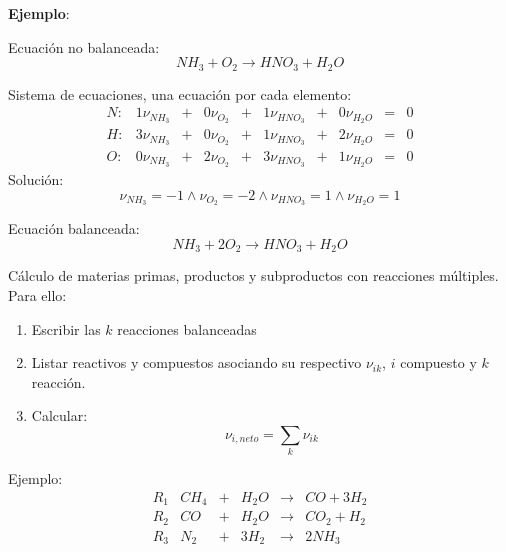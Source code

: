             \textbf{Ejemplo}:
            
            Ecuación no balanceada:
            \[NH_{3} + O_{2} \rightarrow HNO_{3} + H_{2}O\]
            
            Sistema de ecuaciones, una ecuación por cada elemento:
            \[
            \begin{matrix}
                N: & 1\nu_{NH_{3}} & + & 0\nu_{O_{2}} & + & 1\nu_{HNO_{3}} & + & 0\nu_{H_{2}O} & = & 0 \\
                H: & 3\nu_{NH_{3}} & + & 0\nu_{O_{2}} & + & 1\nu_{HNO_{3}} & + & 2\nu_{H_{2}O} & = & 0 \\
                O: & 0\nu_{NH_{3}} & + & 2\nu_{O_{2}} & + & 3\nu_{HNO_{3}} & + & 1\nu_{H_{2}O} & = & 0
            \end{matrix}
            \]
            Solución:
            \[\nu_{NH_{3}} = -1 \wedge \nu_{O_{2}} = -2 \wedge \nu_{HNO_{3}} = 1 \wedge \nu_{H_{2}O} = 1\]
            
            Ecuación balanceada:
            \[NH_{3} + 2O_{2} \rightarrow HNO_{3} + H_{2}O\]
            
            
            Cálculo de materias primas, productos y subproductos con reacciones múltiples. Para ello:
            
            \begin{enumerate}
                \item Escribir las \(k\) reacciones balanceadas
                \item Listar reactivos y compuestos asociando su respectivo \(\nu_{ik}\), \(i\) compuesto y \(k\) reacción.
                \item Calcular:
                \[\nu_{i,neto} = \sum_{k} \nu_{ik}\]
            \end{enumerate}
            
            Ejemplo:
            \[
            \begin{matrix}
                R_{1} & CH_{4} & + & H_{2}O & \rightarrow & CO + 3H_{2} \\
                R_{2} & CO & + & H_{2}O & \rightarrow & CO_{2} + H_{2} \\
                R_{3} & N_{2} & + & 3H_{2} & \rightarrow & 2NH_{3}
            \end{matrix}
            \]
            

